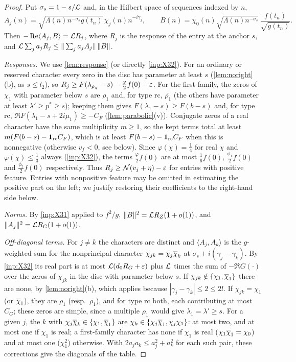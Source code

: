 \begin{proof}
Put $\sigma_s=1-s/\mathcal{L}$ and, in the Hilbert space of sequences indexed by $n$,
\[
  A_j(n)=\sqrt{\Lambda(n)n^{-\sigma_s}g(t_n)}\,\chi_j(n)n^{-i\gamma_j},\qquad
  B(n)=\chi_0(n)\sqrt{\Lambda(n)n^{-\sigma_s}}\,\frac{f(t_n)}{\sqrt{g(t_n)}} .
\]
Then $-\operatorname{Re}\langle A_j,B\rangle=\mathcal{L} R_j$, where $R_j$ is the response of the entry at the anchor $s$, and
$\mathcal{L}\sum_ja_jR_j\le\|\sum_ja_jA_j\|\,\|B\|$.

\emph{Responses.} We use \cref{lem:response} (or directly \cref{inp:X32}). For an ordinary or reserved
character every zero in the disc has parameter at least $s$ (\cref{lem:noright}(b), as $s\le l_2$), so
$R_j\ge F(\lambda_{\rho_\chi}-s)-\frac{\varphi}2f(0)-\varepsilon$. For the first family, the zeros of $\chi_1$ with
parameter below $s$ are $\rho_1$ and, for type $\mathrm{rc}$, $\overline{\rho_1}$ (the others have parameter at
least $\lambda'\ge p^*\ge s$); keeping them gives $F(\lambda_1-s)\ge F(b-s)$ and, for type $\mathrm{rc}$,
$\Re F(\lambda_1-s+2i\mu_1)\ge-C_F$ (\cref{lem:parabolic}(v)). Conjugate zeros of a real character have the
same multiplicity $m\ge1$, so the kept terms total at least $m(F(b-s)-\mathbf{1}_{\mathrm{rc}}C_F)$, which is at least
$F(b-s)-\mathbf{1}_{\mathrm{rc}}C_F$ when this is nonnegative (otherwise $v_f<0$, see below). Since
$\varphi(\chi)=\frac14$ for real $\chi$ and $\varphi(\chi)\le\frac13$ always (\cref{inp:X32}), the terms $\frac{\varphi}2f(0)$ are at
most $\frac16f(0)$, $\frac{\phi_1}2f(0)$ and $\frac{\phi_2}2f(0)$ respectively. Thus
$R_j\ge \mathcal N(v_j+\eta)-\varepsilon$ for entries with positive feature. Entries with nonpositive
feature may be omitted in estimating the positive part on the left; we justify
restoring their coefficients to the right-hand side below.

\emph{Norms.} By \cref{inp:X31} applied to $f^2/g$, $\|B\|^2=\mathcal{L} R_Z(1+o(1))$, and $\|A_j\|^2=\mathcal{L} R_G(1+o(1))$.

\emph{Off-diagonal terms.} For $j\ne k$ the characters are distinct and $\langle A_j,A_k\rangle$ is the
$g$-weighted sum for the nonprincipal character $\chi_{jk}=\chi_j\overline{\chi}_k$ at $\sigma_s+i(\gamma_j-\gamma_k)$. By \cref{inp:X32}
its real part is at most $\mathcal{L}(d_0R_G+\varepsilon)$ plus $\mathcal{L}$ times the sum of $-\Re G(\cdot)$ over the zeros of $\chi_{jk}$ in
the disc with parameter below $s$. If $\chi_{jk}\notin\{\chi_1,\overline{\chi}_1\}$ there are none, by \cref{lem:noright}(b),
which applies because $|\gamma_j-\gamma_k|\le2\le2l$.
If $\chi_{jk}=\chi_1$ (or $\overline{\chi}_1$), they are $\rho_1$ (resp.\ $\overline{\rho_1}$), and for type $\mathrm{rc}$ both, each
contributing at most $C_G$; these zeros are simple, since a multiple $\rho_1$ would give $\lambda_1=\lambda'\ge s$. For a given $j$, the $k$ with $\chi_j\overline{\chi}_k\in\{\chi_1,\overline{\chi}_1\}$ are
$\chi_k\in\{\chi_j\overline{\chi}_1,\chi_j\chi_1\}$: at most two, and at most one if $\chi_1$ is real; a first-family
character has none if $\chi_1$ is real ($\chi_1\overline{\chi}_1=\chi_0$) and at most one ($\chi_1^2$) otherwise. With
$2a_ja_k\le a_j^2+a_k^2$ for each such pair, these corrections give the diagonals of the table.


\end{proof}
